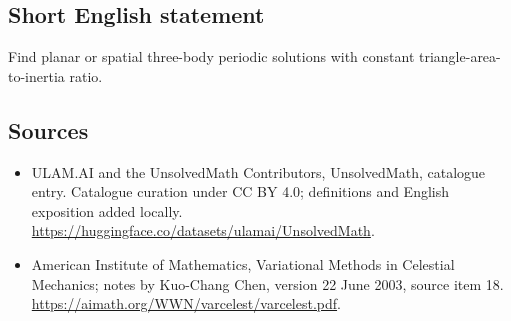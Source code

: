 \documentclass[11pt]{article}
\begin{document}
\subsection{Short English statement}
Find planar or spatial three-body periodic solutions with constant triangle-area-to-inertia ratio.
\subsection{Sources}
\begin{itemize}
\item[\hypertarget{source:statement:1}{S1}] ULAM.AI and the UnsolvedMath Contributors, UnsolvedMath, catalogue entry. Catalogue curation under CC BY 4.0; definitions and English exposition added locally.
\url{https://huggingface.co/datasets/ulamai/UnsolvedMath}.
\item[\hypertarget{source:statement:2}{S2}] American Institute of Mathematics, Variational Methods in Celestial Mechanics; notes by Kuo-Chang Chen, version 22 June 2003, source item 18.
\url{https://aimath.org/WWN/varcelest/varcelest.pdf}.
\end{itemize}
\label{end:statement}
\end{document}
